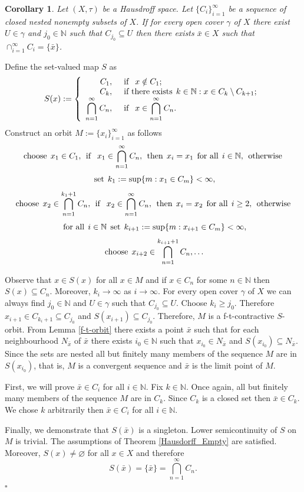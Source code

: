 \documentclass{article}
\renewcommand{\emptyset}{\varnothing}
\def\text#1{\,\;\hbox{#1}\;\,}
\newcommand{\N}{\mathbb{N}}
\renewenvironment{proof}
         {\begin{trivlist}\item[
         {\bf Proof.}]}{{\hfill $\square$} \end{trivlist}}
\newtheorem{cor}[theo]{Corollary}
\begin{document}
\begin{cor} \label{basic_coro_Cantor_topo}
Let $(X, \tau)$ be a Hausdroff space. Let $\{C_i\}_{i=1}^{\infty}$ be a sequence of closed nested nonempty subsets of $X$. If for every open cover $\gamma$ of $X$ there exist $U \in \gamma$ and $j_0 \in \N$ such that $C_{j_0} \subseteq U$ then there exists $\bar{x} \in X$ such that $\cap_{i=1}^{\infty}C_i=\{\bar{x}\}$.
\end{cor}
\begin{proof}
Define the set-valued map $S$ as
\[ S(x):= \left \{\begin{array}{rl} C_1, & \text{if } x \notin C_1;  \\
 C_{k}, & \text{if there exists} k \in \N: x \in C_{k} \setminus C_{k+1};\\
\displaystyle{\bigcap_{n=1}^{\infty}C_n,} & \text{if } \displaystyle{x \in \bigcap_{n=1}^{\infty}C_n}.\end{array}\right.\] Construct an orbit $M:=\{x_i\}_{i=1}^{\infty}$ as follows
\[\text{choose} x_1 \in C_1, \text{if } x_1 \in \bigcap_{n=1}^{\infty}C_n, \text{then} x_i=x_1 \text{for all} i \in \N, \text{otherwise}\] \[\text{set} k_1:=\sup\{m:x_1 \in C_m\} < \infty,\] 
\[\text{choose} x_2 \in \bigcap_{n=1}^{k_1+1} C_n, \text{if } x_2 \in \bigcap_{n=1}^{\infty}C_n, \text{then} x_i=x_2 \text{for all} i \geq 2, \text{otherwise}\] \[\text{for all} i \in \N \text{set} k_{i+1}:= \sup\{m:x_{i+1} \in C_m\} < \infty, \] 
\[\text{choose} x_{i+2} \in \bigcap_{n=1}^{k_{i+1}+1} C_n, \dots\]

Observe that $x \in S(x)$ for all $x \in M$ and if $x \in C_n$ for some $n \in \N$ then $S(x) \subseteq C_n$. Moreover, $k_i \rightarrow \infty$ as $i\rightarrow \infty$. For every open cover $\gamma$ of $X$ we can always find $j_0 \in \N$ and $U \in \gamma$ such that $C_{j_0} \subseteq U$. Choose $k_{i} \geq j_0$. Therefore $x_{i+1} \in C_{k_i+1} \subseteq C_{j_0}$ and $S(x_{i+1}) \subseteq C_{j_0}$. Therefore, $M$ is a f-t-contractive $S$-orbit. From Lemma \ref{f-t-orbit} there exists a point $\bar{x}$ such that for each neighbourhood $N_{\bar{x}}$ of $\bar{x}$ there exists $i_0 \in \N$ such that $x_{i_0} \in N_{\bar{x}}$ and $S(x_{i_0}) \subseteq N_{\bar{x}}$. Since the sets are nested all but finitely many members of the sequence $M$ are in $S(x_{i_0})$, that is, $M$ is a convergent sequence and $\bar{x}$ is the limit point of $M$.

First, we will prove $\bar{x} \in C_i$ for all $i \in \N$.  Fix $k \in \N$. Once again, all but finitely many members of the sequence $M$ are in $C_k$. Since $C_k$ is a closed set then $\bar{x} \in C_k$. We chose $k$ arbitrarily then $\bar{x} \in C_i$ for all $i \in \N$.

Finally, we demonstrate that $S(\bar{x})$ is a singleton. Lower semicontinuity of $S$ on $M$ is trivial. The assumptions of Theorem \ref{Hausdorff_Empty} are satisfied. Moreover, $S(x) \neq \emptyset$ for all $x \in X$ and therefore \[S(\bar{x})=\{\bar{x}\}=\displaystyle{\bigcap_{n=1}^{\infty}C_n}.\] 
\end{proof}
\end{document}

